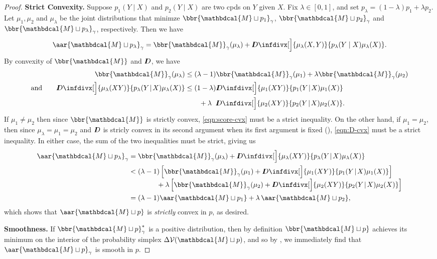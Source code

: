 \documentclass{article}
\theoremstyle{plain}
\newcounter{proofcntr}
\newenvironment{lproof}{\begin{proof}\refstepcounter{proofcntr}}{\end{proof}}
\theoremstyle{definition}
\theoremstyle{remark}
\newcommand{\thickD}{I\mkern-8muD}
\newcommand{\kldiv}{\thickD\infdivx}
\newcommand{\V}{\mathcal V}
\newcommand{\dg}[1]{\mathbdcal{#1}}
\newcommand\smid{\!\mid\!}
\newcommand{\bundle}{\mathbin{\sqcup}}
\begin{document}
\begin{lproof}
	\textbf{Strict Convexity.}
	Suppose $p_1(Y \mid X)$ and $p_2(Y\mid X)$ are two cpds on $Y$ given $X$.
	Fix $\lambda \in [0,1]$, and set $p_\lambda = (1-\lambda) p_1 + \lambda p_2$.
	Let $\mu_1, \mu_2$ and $\mu_\lambda$ be the joint distributions that minimze $\bbr{\dg M \bundle p_1}_\gamma$, $\bbr{\dg M \bundle p_2}_\gamma$ and $\bbr{\dg M \bundle p_\lambda}_\gamma$, respectively.  Then we have
	\begin{equation*}
		\aar{\dg M \bundle p_\lambda}_\gamma
			= \bbr{\dg M}_\gamma(\mu_\lambda) + \kldiv[\Big]{\mu_\lambda(X,Y)}{p_\lambda(Y\mid X) \mu_\lambda( X)}.
	\end{equation*}
	By convexity of $\bbr{\dg M}$ and $\thickD$, we have
	\begin{align}
		\bbr{\dg M}_\gamma(\mu_\lambda)
		 	&\le (\lambda-1)\bbr{\dg M}_\gamma(\mu_1) + \lambda \bbr{\dg M}_\gamma(\mu_2)
			 	\label{eqn:score-cvx}\\
		\text{and}\qquad \kldiv[\Big]{\mu_\lambda(XY)}{p_\lambda(Y\smid X) \mu_\lambda( X)}
			&\le (1-\lambda)\kldiv[\Big]{\mu_1(XY)}{p_1(Y \smid X) \mu_1( X)} \nonumber \\
			&\qquad+ \lambda\;\;\kldiv[\Big]{\mu_2(XY)}{p_2(Y\smid X) \mu_2( X)}.
				\label{eqn:D-cvx}
	\end{align}
	If $\mu_1 \ne \mu_2$ then since $\bbr{\dg M}$ is strictly convex, \eqref{eqn:score-cvx} must
	be a strict inequality. On the other hand, if $\mu_1 = \mu_2$, then since $\mu_\lambda = \mu_1 = \mu_2$ and $\thickD$ is stricly convex in its second argument when its first argument is fixed (), \eqref{eqn:D-cvx} must be a strict inequality.
	In either case, the sum of the two inequalities must be strict, giving us
	\begin{align*}
		\aar{\dg M \bundle p_\lambda}_\gamma &=
		\bbr{\dg M}_\gamma(\mu_\lambda) + \kldiv[\Big]{\mu_\lambda(XY)}{p_\lambda(Y\smid X) \mu_\lambda( X)} \\
		&<
		 (\lambda-1) \left[\bbr{\dg M}_\gamma(\mu_1)
			 	+ \kldiv[\Big]{\mu_1(XY)}{p_1(Y \smid X) \mu_1( X)} \right]
			 \\[-0.3em]&\qquad\qquad
			 + \lambda \left[ \bbr{\dg M}_\gamma(\mu_2)
			 	+ \kldiv[\Big]{\mu_2(XY)}{p_2(Y\smid X) \mu_2( X)}
			 	\right] \\
		 &= (\lambda-1) \aar{\dg M \bundle p_1} + \lambda\,\aar{\dg M \bundle p_2},
	\end{align*}
	which shows that $\aar{\dg M \bundle p}$ is \emph{strictly} convex in $p$, as desired.


	\textbf{Smoothness.}
	If $\bbr{\dg M \bundle p}_\gamma^*$ is a positive distribution, then by definition $\bbr{\dg M \bundle p}$ achieves its minimum on the interior of the probability simplex $\Delta \V(\dg M \bundle p)$, and so by , we immediately find that $\aar{\dg M \bundle p}_\gamma$ is smooth in $p$.


\end{lproof}
\end{document}
